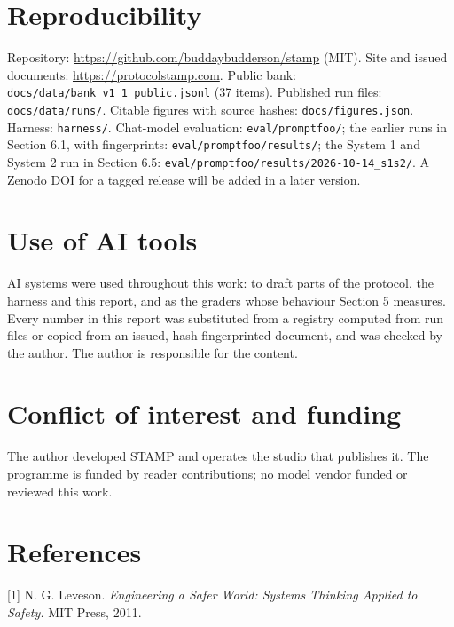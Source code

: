 \documentclass[
  11pt,
]{article}
\begin{document}
\hypertarget{reproducibility}{%
\section{Reproducibility}\label{reproducibility}}

Repository: \url{https://github.com/buddaybudderson/stamp} (MIT). Site
and issued documents: \url{https://protocolstamp.com}. Public bank:
\texttt{docs/data/bank\_v1\_1\_public.jsonl} (37 items). Published run
files: \texttt{docs/data/runs/}. Citable figures with source hashes:
\texttt{docs/figures.json}. Harness: \texttt{harness/}. Chat-model
evaluation: \texttt{eval/promptfoo/}; the earlier runs in Section 6.1,
with fingerprints: \texttt{eval/promptfoo/results/}; the System 1 and
System 2 run in Section 6.5:
\texttt{eval/promptfoo/results/2026-10-14\_s1s2/}. A Zenodo DOI for a
tagged release will be added in a later version.

\hypertarget{use-of-ai-tools}{%
\section{Use of AI tools}\label{use-of-ai-tools}}

AI systems were used throughout this work: to draft parts of the
protocol, the harness and this report, and as the graders whose
behaviour Section 5 measures. Every number in this report was
substituted from a registry computed from run files or copied from an
issued, hash-fingerprinted document, and was checked by the author. The
author is responsible for the content.

\hypertarget{conflict-of-interest-and-funding}{%
\section{Conflict of interest and
funding}\label{conflict-of-interest-and-funding}}

The author developed STAMP and operates the studio that publishes it.
The programme is funded by reader contributions; no model vendor funded
or reviewed this work.

\hypertarget{references}{%
\section{References}\label{references}}

{[}1{]} N. G. Leveson. \emph{Engineering a Safer World: Systems Thinking
Applied to Safety.} MIT Press, 2011.
\end{document}
